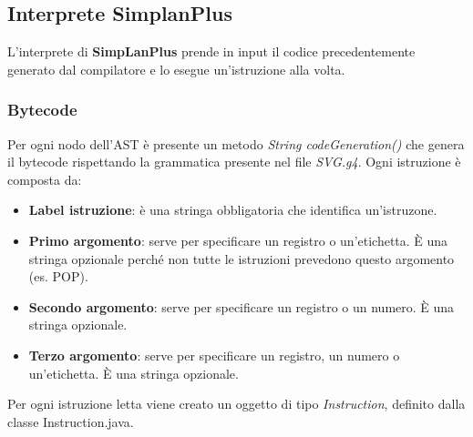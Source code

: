 \documentclass[../../main]{subfiles}
\begin{document}
\subsection{Interprete SimplanPlus}
L'interprete di \textbf{SimpLanPlus} prende in input il codice precedentemente generato dal compilatore e lo esegue un'istruzione alla volta. 
\subsubsection{Bytecode}
Per ogni nodo dell'AST è presente un metodo \emph{String codeGeneration()} che genera il bytecode rispettando la grammatica presente nel file \emph{SVG.g4}.
Ogni istruzione è composta da: 
\begin{itemize}
    \item \textbf{Label istruzione}: è una stringa obbligatoria che identifica un'istruzone. 
    \item \textbf{Primo argomento}: serve per specificare un registro o un'etichetta. È una stringa opzionale perché non tutte le istruzioni prevedono questo argomento (es. POP).
    \item \textbf{Secondo argomento}: serve per specificare un registro o un numero. È una stringa opzionale.
    \item \textbf{Terzo argomento}: serve per specificare un registro, un numero o un'etichetta. È una stringa opzionale.
\end{itemize}
Per ogni istruzione letta viene creato un oggetto di tipo \emph{Instruction}, definito dalla classe Instruction.java.
\end{document}
